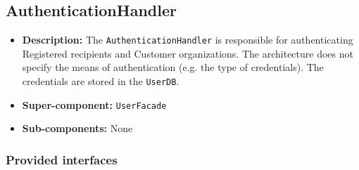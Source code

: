\documentclass[a4paper,10pt]{article}
\begin{document}
\subsection{AuthenticationHandler}
\begin{itemize}
    \item \textbf{Description:} The \texttt{AuthenticationHandler} is responsible for authenticating Registered recipients and Customer organizations. The architecture does not specify the means of authentication (e.g. the type of credentials). The credentials are stored in the \texttt{UserDB}.
    \item \textbf{Super-component:} \texttt{UserFacade}
    \item \textbf{Sub-components:} None
\end{itemize}

\subsubsection*{Provided interfaces}
\end{document}
